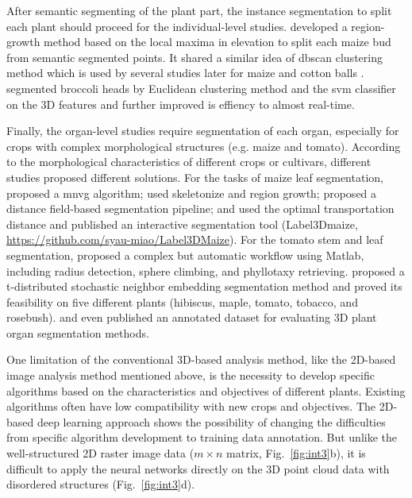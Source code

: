 After semantic segmenting of the plant part, the instance segmentation to split each plant should proceed for the individual-level studies. \citet{hofle_radiometric_2014} developed a region-growth method based on the local maxima in elevation to split each maize bud from semantic segmented points. It shared a similar idea of \gls{dbscan} clustering method which is used by several studies later for maize \citep{lin_segmentation_2022} and cotton balls \citep{sun_3d_2020}. \citet{kusumam_3d_2017} segmented broccoli heads by Euclidean clustering method and the \gls{svm} classifier on the 3D features and \citet{montes_real-time_2020} further improved is effiency to almost real-time.

Finally, the organ-level studies require segmentation of each organ, especially for crops with complex morphological structures (e.g. maize and tomato). According to the morphological characteristics of different crops or cultivars, different studies proposed different solutions. For the tasks of maize leaf segmentation, \citet{jin_stemleaf_2019} proposed a \gls{mnvg} algorithm; \citet{liu_canopy_2021} used skeletonize and region growth; \citet{wang_dfsp_2023} proposed a distance field-based segmentation pipeline; and \citet{miao_label3dmaize_2021} used the optimal transportation distance and published an interactive segmentation tool (Label3Dmaize, \url{https://github.com/syau-miao/Label3DMaize}). For the tomato stem and leaf segmentation, \citet{rossi_implementation_2022} proposed a complex but automatic workflow using Matlab, including radius detection, sphere climbing, and phyllotaxy retrieving. \citet{helin_using_2023} proposed a t-distributed stochastic neighbor embedding segmentation method and proved its feasibility on five different plants (hibiscus, maple, tomato, tobacco, and rosebush). \citet{dutagaci_rose-x_2020} and \citet{schunck_pheno4d_2021} even published an annotated dataset for evaluating 3D plant organ segmentation methods.

One limitation of the conventional 3D-based analysis method, like the 2D-based image analysis method mentioned above, is the necessity to develop specific algorithms based on the characteristics and objectives of different plants. Existing algorithms often have low compatibility with new crops and objectives. The 2D-based deep learning approach shows the possibility of changing the difficulties from specific algorithm development to training data annotation. But unlike the well-structured 2D raster image data ($m \times n$ matrix, Fig.~\ref{fig:int3}b), it is difficult to apply the neural networks directly on the 3D point cloud data with disordered structures (Fig.~\ref{fig:int3}d).

